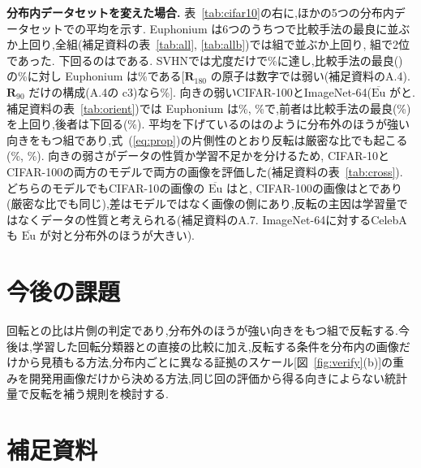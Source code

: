 \documentclass[MIRU,submit,onecolumn]{miru2025j}
\newcommand{\Rot}[1]{\mathbf{R}_{#1}}
\newcommand{\Eu}{\mathrm{Eu}}        %
\renewcommand{\eqref}[1]{(\ref{#1})}   %
\begin{document}
\textbf{分布内データセットを変えた場合.}
表~\ref{tab:cifar10}の右に,ほかの5つの分布内データセットでの平均を示す. %
Euphonium は6つのうち\nIDbest{}つで比較手法の最良に並ぶか上回り,全\nPairs{}組(補足資料の表~\ref{tab:all}, \ref{tab:allb})では\winsAll{}組で並ぶか上回り, \secondAll{}組で2位であった.%
下回るのは\idLoseList{}である. SVHNでは尤度だけで\oNLLSVHN\%に達し,比較手法の最良(\oBestNameSVHN)の\oBestSVHN\%に対し Euphonium は\oGSVHN\%である[$\Rot{180}$ の原子は数字では弱い(補足資料のA.4). $\Rot{90}$ だけの構成(A.4の c3)なら\prevSVHNmean\%]. %
向きの弱いCIFAR-100とImageNet-64($\overline{\Eu}$ が\gbarCh{}と\gbarIN. 補足資料の表~\ref{tab:orient})では Euphonium は\oGCh\%, \oGIN\%で,前者は比較手法の最良(\oBestCh\%)を上回り,後者は下回る(\oBestIN\%).%
平均を下げているのは\revText{}のように分布外のほうが強い向きをもつ組であり,式~\eqref{eq:prop}の片側性のとおり反転は厳密な比でも起こる(\oWorstODECh\%, \oWorstODEIN\%).%
向きの弱さがデータの性質か学習不足かを分けるため, CIFAR-10とCIFAR-100の両方のモデルで両方の画像を評価した(補足資料の表~\ref{tab:cross}).%
どちらのモデルでもCIFAR-10の画像の $\overline{\Eu}$ は\crossGCtenCten{}と\crossGChCten{}, CIFAR-100の画像は\crossGCtenCh{}と\crossGChCh{}であり(厳密な比でも同じ),差はモデルではなく画像の側にあり,反転の主因は学習量ではなくデータの性質と考えられる(補足資料のA.7. ImageNet-64に対するCelebAも $\overline{\Eu}$ が\gbarINCel{}対\gbarIN{}と分布外のほうが大きい).

\section{今後の課題}
回転との比は片側の判定であり,分布外のほうが強い向きをもつ組で反転する.今後は,学習した回転分類器との直接の比較に加え,反転する条件を分布内の画像だけから見積もる方法,分布内ごとに異なる証拠のスケール[図~\ref{fig:verify}(b)]の重みを開発用画像だけから決める方法,同じ\nfeG{}回の評価から得る向きによらない統計量で反転を補う規則を検討する.



\clearpage
\section*{補足資料}
\renewcommand{\thetable}{A\arabic{table}}\setcounter{table}{0}
\renewcommand{\thefigure}{A\arabic{figure}}\setcounter{figure}{0}
\end{document}
